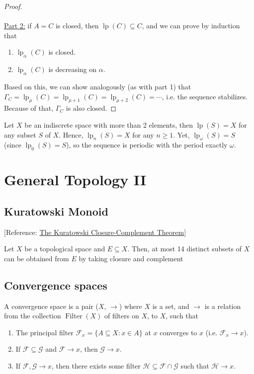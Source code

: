 \documentclass{treatise}
\begin{document}
\begin{shaded}
\begin{proof}
\\
\\
\underline{Part 2:} if $A = C$ is closed, then $\operatorname{lp}(C) \subseteq C$, and we can prove by induction that
\begin{enumerate}
    \item $\operatorname{lp}_\alpha (C)$ is closed.
    \item $\operatorname{lp}_\alpha (C)$ is decreasing on $\alpha$.
\end{enumerate}
Based on this, we can show analogously (as with part 1) that $\Gamma_C = \operatorname{lp}_{\mu}(C) = \operatorname{lp}_{\mu + 1}(C) = \operatorname{lp}_{\mu + 2}(C) = \cdots$, i.e. the sequence stabilizes. Because of that, $\Gamma_C$ is also closed.
\end{proof}
\begin{remark}
Let $X$ be an indiscrete space with more than 2 elements, then $\operatorname{lp}(S) = X$ for any subset $S$ of $X$. Hence, $\operatorname{lp}_n (S) = X$ for any $n \geq 1$. Yet, $\operatorname{lp}_\omega(S) = S$ (since $\operatorname{lp}_0 (S) = S$), so the sequence is periodic with the period exactly $\omega$.
\end{remark}

\newpage
\newpage

\chapter{General Topology II}
\section{Kuratowski Monoid}
{[Reference: \href{https://www.mathtransit.com/cornucopia/2008_gj_a.php}{The Kuratowski Closure-Complement Theorem}]}
\begin{theorem}
Let $X$ be a topological space and $E \subseteq X$. Then, at most 14 distinct subsets of $X$ can be obtained from $E$ by taking closure and complement
\end{theorem}
\section{Convergence spaces}
A convergence space is a pair ($X$, $\to$) where $X$ is a set, and $\to$ is a relation from the collection $\operatorname{Filter}(X)$ of filters on $X$, to $X$, such that
\begin{enumerate}
    \item The principal filter $\mathcal{F}_x = \{ A \subseteq X : x \in A \}$ at $x$ converges to $x$ (i.e. $\mathcal{F}_x \to x$).
    \item If $\mathcal{F} \subseteq \mathcal{G}$ and $\mathcal{F} \to x$, then $\mathcal{G} \to x$.
    \item If $\mathcal{F}, \mathcal{G} \to x$, then there exists some filter $\mathcal{H} \subseteq \mathcal{F} \cap \mathcal{G}$ such that $\mathcal{H} \to x$.
\end{enumerate}


\end{shaded}
\end{document}
